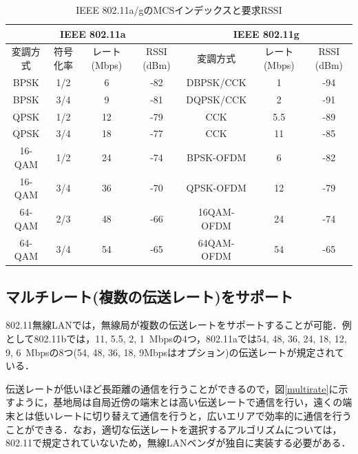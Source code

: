 \documentclass[a4paper,10pt]{ltjsarticle}
\begin{document}
\begin{table}[H]
  \centering
  \caption{IEEE 802.11a/gのMCSインデックスと要求RSSI}
  \label{table:mcs_11abg_rssi}
  \begin{tabular}{c|c|c|c|c|c|c}
      \hline
      \multicolumn{4}{c|}{IEEE 802.11a} & \multicolumn{3}{c}{IEEE 802.11g} \\
      \hline
      変調方式 & 符号化率 & レート (Mbps) & RSSI (dBm) & 変調方式 & レート (Mbps) & RSSI (dBm) \\
      \hline
      BPSK & 1/2 & 6 & -82 & DBPSK/CCK & 1 & -94 \\
      BPSK & 3/4 & 9 & -81 & DQPSK/CCK & 2 & -91 \\
      QPSK & 1/2 & 12 & -79 & CCK & 5.5 & -89 \\
      QPSK & 3/4 & 18 & -77 & CCK & 11 & -85 \\
      16-QAM & 1/2 & 24 & -74 & BPSK-OFDM & 6 & -82 \\
      16-QAM & 3/4 & 36 & -70 & QPSK-OFDM & 12 & -79 \\
      64-QAM & 2/3 & 48 & -66 & 16QAM-OFDM & 24 & -74 \\
      64-QAM & 3/4 & 54 & -65 & 64QAM-OFDM & 54 & -65 \\
      \hline
  \end{tabular}
\end{table}

\subsection{マルチレート(複数の伝送レート)をサポート}

802.11無線LANでは，無線局が複数の伝送レートをサポートすることが可能．例として802.11bでは，11, 5.5, 2, 1\, Mbpsの4つ，802.11aでは54, 48, 36, 24, 18, 12, 9, 6\, Mbpsの8つ(54, 48, 36, 18, 9Mbpsはオプション)の伝送レートが規定されている．

伝送レートが低いほど長距離の通信を行うことができるので，図\ref{multirate}に示すように，基地局は自局近傍の端末とは高い伝送レートで通信を行い，遠くの端末とは低いレートに切り替えて通信を行うと，広いエリアで効率的に通信を行うことができる．なお，適切な伝送レートを選択するアルゴリズムについては，802.11で規定されていないため，無線LANベンダが独自に実装する必要がある．
\end{document}
